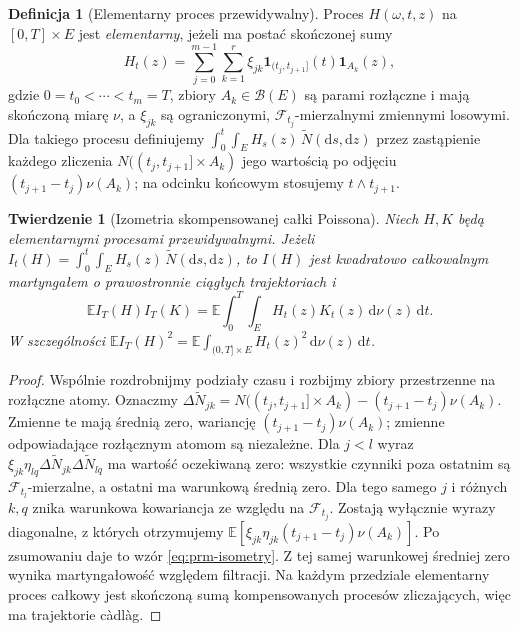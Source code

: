 \documentclass[11pt,a4paper,oneside]{report}
\numberwithin{equation}{chapter}
\theoremstyle{plain}
\newtheorem{twierdzenie}{Twierdzenie}[chapter]
\theoremstyle{definition}
\newtheorem{definicja}{Definicja}[chapter]
\theoremstyle{remark}
\newcommand{\E}{\mathbb{E}}
\newcommand{\calF}{\mathcal{F}}
\newcommand{\calB}{\mathcal{B}}
\newcommand{\ind}[1]{\mathbf{1}_{#1}}
\newcommand{\dd}{\mathrm{d}}
\begin{document}
\begin{definicja}[Elementarny proces przewidywalny]\label{def:volIII:11:02}
\label{def:prm-step}
Proces $H(\omega,t,z)$ na $[0,T]\times E$ jest
\emph{elementarny}, jeżeli ma postać skończonej sumy
\[
H_t(z)=\sum_{j=0}^{m-1}\sum_{k=1}^{r}
\xi_{jk}\ind{(t_j,t_{j+1}]}(t)\ind{A_k}(z),
\]
gdzie $0=t_0<\cdots<t_m=T$, zbiory $A_k\in\calB(E)$
są parami rozłączne i mają skończoną miarę $\nu$,
a $\xi_{jk}$ są ograniczonymi, $\calF_{t_j}$-mierzalnymi
zmiennymi losowymi. Dla takiego procesu definiujemy
$\int_0^t\int_EH_s(z)\,\widetilde N(\dd s,\dd z)$
przez zastąpienie każdego zliczenia $N((t_j,t_{j+1}]\times A_k)$
jego wartością po odjęciu $(t_{j+1}-t_j)\nu(A_k)$;
na odcinku końcowym stosujemy $t\wedge t_{j+1}$.
\end{definicja}

\begin{twierdzenie}[Izometria skompensowanej całki Poissona]\label{thm:volIII:11:03}
\label{th:prm-isometry}
Niech $H,K$ będą elementarnymi procesami przewidywalnymi.
Jeżeli $I_t(H)=\int_0^t\int_EH_s(z)\,\widetilde N(\dd s,\dd z)$,
to $I(H)$ jest kwadratowo całkowalnym martyngałem o
prawostronnie ciągłych trajektoriach i
\[
\E I_T(H)I_T(K)
=\E\int_0^T\int_E H_t(z)K_t(z)\,\dd\nu(z)\,\dd t.
\tag{11.2}\label{eq:prm-isometry}
\]
W szczególności $\E I_T(H)^2=\E\int_{(0,T]\times E} H_t(z)^2\,\dd\nu(z)\,\dd t$.
\end{twierdzenie}
\begin{proof}
Wspólnie rozdrobnijmy podziały czasu i rozbijmy zbiory
przestrzenne na rozłączne atomy. Oznaczmy
$\Delta\widetilde N_{jk}=N((t_j,t_{j+1}]\times A_k)
-(t_{j+1}-t_j)\nu(A_k)$.
Zmienne te mają średnią zero, wariancję
$(t_{j+1}-t_j)\nu(A_k)$; zmienne odpowiadające
rozłącznym atomom są niezależne. Dla $j<l$ wyraz
$\xi_{jk}\eta_{lq}\Delta\widetilde N_{jk}
\Delta\widetilde N_{lq}$ ma wartość oczekiwaną zero:
wszystkie czynniki poza ostatnim są $\calF_{t_l}$-mierzalne,
a ostatni ma warunkową średnią zero. Dla tego samego $j$
i różnych $k,q$ znika warunkowa kowariancja ze względu
na $\calF_{t_j}$. Zostają wyłącznie wyrazy diagonalne,
z których otrzymujemy
$\E[\xi_{jk}\eta_{jk}(t_{j+1}-t_j)\nu(A_k)]$.
Po zsumowaniu daje to wzór \eqref{eq:prm-isometry}.
Z tej samej warunkowej średniej zero wynika martyngałowość
względem filtracji. Na każdym przedziale elementarny
proces całkowy jest skończoną sumą kompensowanych
procesów zliczających, więc ma trajektorie càdlàg.
\end{proof}
\end{document}
